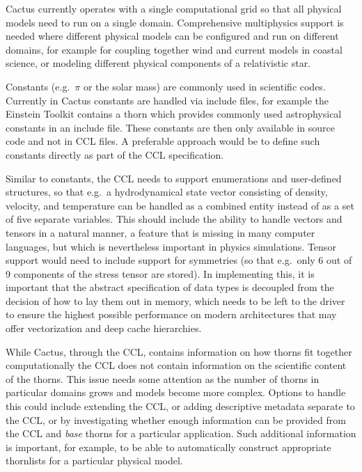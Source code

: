 \documentclass[conference]{IEEEtran}
\begin{document}
Cactus currently operates with a single computational grid so that all physical models need to run on a single domain. Comprehensive multiphysics support is needed 
where different physical models can be configured and run on different domains, for example for coupling together wind and current models 
in coastal science, or modeling different physical components of a relativistic star. 
 
Constants (e.g.\ $\pi$ or the solar mass) are commonly used in
  scientific codes. Currently in Cactus constants are handled via
  include files, for example the Einstein Toolkit contains a thorn
  which provides commonly used astrophysical constants in an include
  file.  These constants are then only available in source code and
  not in CCL files.  A preferable approach would be to define such
  constants directly as part of the CCL specification.

Similar to constants, the CCL needs to support enumerations and
  user-defined structures, so that e.g.\ a hydrodynamical state vector
  consisting of density, velocity, and temperature can be handled as a
  combined entity instead of as a set of five separate variables.  This
  should include the ability to handle vectors and tensors in a
  natural manner, a feature that is missing in many computer
  languages, but which is nevertheless important in physics
  simulations.  Tensor support would need to include support for
  symmetries (so that e.g.\ only 6 out of 9 components of the stress tensor
  are stored).
  In implementing this, it is important that the abstract
  specification of data types is decoupled from the decision of how to
  lay them out in memory, which needs to be left to the driver to
  ensure the highest possible performance on modern architectures that
  may offer vectorization and deep cache hierarchies.

While Cactus, through the CCL, contains information on how thorns fit together computationally the CCL does not contain information on the scientific content of the thorns. This issue needs some attention as the number of thorns in particular domains grows and models become more complex. 
Options to handle this could include extending the CCL, or adding descriptive metadata separate to the CCL, or by investigating whether enough information can be provided from the CCL and {\it base} thorns for a particular application. Such additional information is important, for example, to be able to automatically construct appropriate thornlists for a particular physical model.
\end{document}
